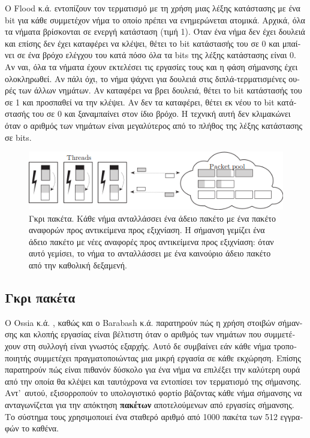 \begin{greek}
Ο Flood κ.ά. \cite{DBLP:conf/jvm/FloodDSZ01} εντοπίζουν τον
τερματισμό με τη χρήση μιας λέξης κατάστασης με ένα bit για
κάθε συμμετέχον νήμα το οποίο πρέπει να ενημερώνεται ατομικά.
Αρχικά, όλα τα νήματα βρίσκονται σε ενεργή κατάσταση (τιμή 1).
Όταν ένα νήμα δεν έχει δουλειά και επίσης δεν έχει καταφέρει
να κλέψει, θέτει το bit κατάστασής του σε 0 και μπαίνει σε
ένα βρόχο ελέγχου του κατά πόσο όλα τα bits της λέξης κατάστασης
είναι 0. Αν ναι, όλα τα νήματα έχουν εκτελέσει τις εργασίες
τους και η φάση σήμανσης έχει ολοκληρωθεί. Αν πάλι όχι, το νήμα
ψάχνει για δουλειά στις διπλά-τερματισμένες ουρές των άλλων
νημάτων. Αν καταφέρει να βρει δουλειά, θέτει το bit κατάστασής
του σε 1 και προσπαθεί να την κλέψει. Αν δεν τα καταφέρει,
θέτει εκ νέου το bit κατάστασής του σε 0 και ξαναμπαίνει στον
ίδιο βρόχο. Η τεχνική αυτή δεν κλιμακώνει όταν ο αριθμός των
νημάτων είναι μεγαλύτερος από το πλήθος της λέξης κατάστασης
σε bits.

\begin{figure}
  \centering
  \includegraphics{figures/par_2}
  \caption[Γκρι πακέτα.]
    {Γκρι πακέτα. Κάθε νήμα ανταλλάσσει ένα άδειο πακέτο με
     ένα πακέτο αναφορών προς αντικείμενα προς εξιχνίαση. Η
     σήμανση γεμίζει ένα άδειο πακέτο με νέες αναφορές προς
     αντικείμενα προς εξιχνίαση: όταν αυτό γεμίσει, το νήμα
     το ανταλλάσσει με ένα καινούριο άδειο πακέτο από την
     καθολική δεξαμενή.}
  \label{fig:par_2}
\end{figure}

\subsection{Γκρι πακέτα}
Ο Ossia κ.ά. \cite{DBLP:conf/pldi/OssiaBGKLO02}, καθώς και ο
Barabash κ.ά. \cite{DBLP:journals/toplas/BarabashBGKLOOP05} 
παρατηρούν πώς η χρήση στοιβών
σήμανσης και κλοπής εργασίας είναι βέλτιστη όταν ο αριθμός των
νημάτων που συμμετέχουν στη συλλογή είναι γνωστός εξαρχής. Αυτό
δε συμβαίνει εάν κάθε νήμα τροποποιητής συμμετέχει πραγματοποιώντας
μια μικρή εργασία σε κάθε εκχώρηση. Επίσης παρατηρούν πώς είναι
πιθανόν δύσκολο για ένα νήμα να επιλέξει την καλύτερη ουρά από
την οποία θα κλέψει και ταυτόχρονα να εντοπίσει τον τερματισμό
της σήμανσης. Αντ'~αυτού, εξισορροπούν το υπολογιστικό φορτίο
βάζοντας κάθε νήμα σήμανσης να ανταγωνίζεται για την απόκτηση
\textbf{πακέτων} αποτελούμενων από εργασίες σήμανσης. Το σύστημα
τους χρησιμοποιεί ένα σταθερό αριθμό από 1000 πακέτα των 512
εγγραφών το καθένα.


\end{greek}
